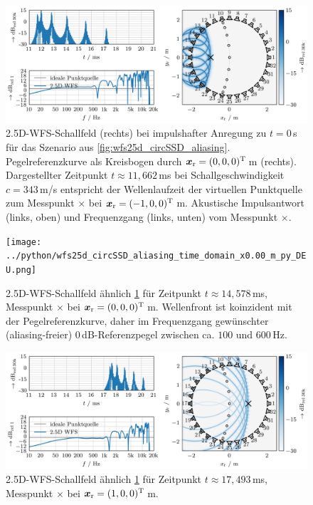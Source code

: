 \begin{figure}[t]
\centering
\begin{plotfigures}
\includegraphics[width=145mm]{../python/wfs25d_circSSD_aliasing_time_domain_x-1.00_m_py_DEU.png}
\end{plotfigures}
\caption{2.5D-WFS-Schallfeld (rechts) bei impulshafter Anregung zu $t=0$\,s für das
Szenario aus \Abb\ref{fig:wfs25d_circSSD_aliasing}.
%
Pegelreferenzkurve als Kreisbogen durch $\bm{x}_\mathrm{r}=(0,0,0)^\mathrm{T}$\,m (rechts).
%
Dargestellter Zeitpunkt $t\approx 11{,}662$\,ms bei Schallgeschwindigkeit
$c=343$\,m/s entspricht der Wellenlaufzeit der virtuellen Punktquelle zum
Messpunkt $\times$ bei $\bm{x}_\mathrm{r}=(-1,0,0)^\mathrm{T}$\,m.
%
Akustische Impulsantwort (links, oben) und Frequenzgang (links, unten) vom Messpunkt $\times$.
%
\cc
}
\label{fig:td_-1m}
\end{figure}
%
%
%
\begin{figure}[h!]
\centering
\begin{plotfigures}
\texttt{[image: ../python/wfs25d\_circSSD\_aliasing\_time\_domain\_x0.00\_m\_py\_DEU.png]}
\end{plotfigures}
\caption{2.5D-WFS-Schallfeld
ähnlich \Abb\ref{fig:td_-1m} für Zeitpunkt $t \approx 14{,}578$\,ms,
Messpunkt $\times$ bei $\bm{x}_\mathrm{r}=(0,0,0)^\mathrm{T}$\,m.
%
Wellenfront ist koinzident mit der Pegelreferenzkurve, daher
%
im Frequenzgang gewünschter (aliasing-freier) $0$\,dB-Referenzpegel zwischen ca. $100$ und $600$\,Hz.
%
\cc
}
\label{fig:td_0m}
\end{figure}
%
%
%
\begin{figure}[h!]
\centering
\begin{plotfigures}
\includegraphics[width=145mm]{../python/wfs25d_circSSD_aliasing_time_domain_x1.00_m_py_DEU.png}
\end{plotfigures}
\caption{2.5D-WFS-Schallfeld
ähnlich \Abb\ref{fig:td_-1m} für Zeitpunkt $t \approx 17{,}493$\,ms,
Messpunkt $\times$ bei $\bm{x}_\mathrm{r}=(1,0,0)^\mathrm{T}$\,m.
%
\cc
}
\label{fig:td_1m}
\end{figure}
